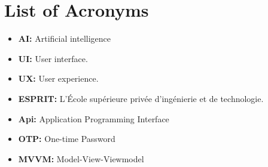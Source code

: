 \chapter*{List of Acronyms}

\vspace{3cm}
\begin{itemize}
    \item \textbf{AI:} Artificial intelligence 
    \item \textbf{UI:} User interface.
    \item \textbf{UX:} User experience.
    \item \textbf{ESPRIT:} L'École supérieure privée d'ingénierie et de technologie.    
    \item \textbf{Api:} Application Programming Interface
    \item \textbf{OTP:} One-time Password
    \item \textbf{MVVM:} Model-View-Viewmodel

\end{itemize}
